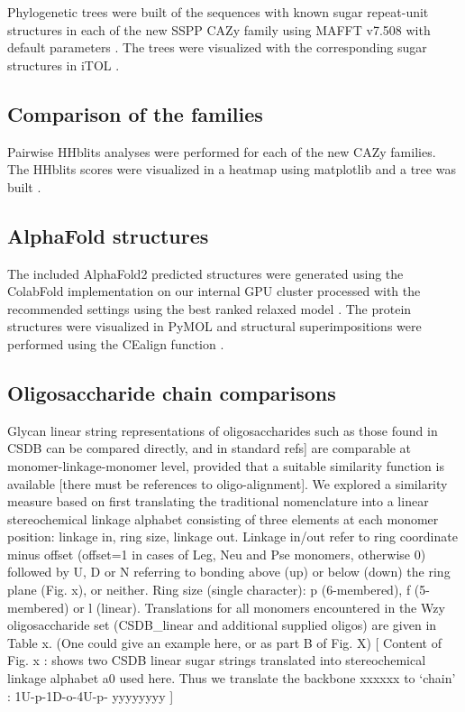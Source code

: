 \documentclass{article}
\begin{document}
Phylogenetic trees were built of the sequences with known sugar repeat-unit structures in each of the new SSPP CAZy family using MAFFT v7.508 with default parameters
\cite{katoh_mafft_2013}. The trees were visualized with the corresponding sugar structures in iTOL \cite{letunic_interactive_2021}.

\subsection{Comparison of the families}
Pairwise HHblits analyses \cite{remmert_hhblits_2012} were performed for each of the new CAZy families. The HHblits scores were visualized in a heatmap using matplotlib and a tree was built .  

\subsection{AlphaFold structures}
The included AlphaFold2 predicted structures were generated using the ColabFold implementation on our internal GPU cluster processed with the recommended settings using the best ranked relaxed model \cite{mirdita_colabfold_2022}.
The protein structures were visualized in PyMOL and structural superimpositions were performed using the CEalign function \cite{schrodinger_llc_pymol_2015}.

\subsection{Oligosaccharide chain comparisons}

Glycan linear string representations of oligosaccharides such as those found in CSDB \cite{toukach_carbohydrate_2016} can be compared directly, and in standard refs] are comparable at monomer-linkage-monomer level, provided that a suitable similarity function is available [there must be references to oligo-alignment]. We explored a similarity measure based on first translating the traditional nomenclature into a linear stereochemical linkage alphabet consisting of three elements at each monomer position: linkage in, ring size, linkage out. 
	Linkage in/out refer to ring coordinate minus offset (offset=1 in cases of Leg, Neu and Pse monomers, otherwise 0) followed by U, D or N referring to bonding above (up) or below (down) the ring plane (Fig. x), or neither.
	Ring size (single character): p (6-membered), f (5-membered) or l (linear). %
	Translations for all monomers encountered in the Wzy oligosaccharide set (CSDB\_linear and additional supplied oligos) are given in Table x. (One could give an example here, or as part B of Fig. X)
[ Content of Fig. x : shows two CSDB linear sugar strings translated into stereochemical linkage alphabet a0 used here. Thus we translate the backbone xxxxxx to ‘chain’ : 1U-p-1D-o-4U-p- yyyyyyyy ]
\end{document}
